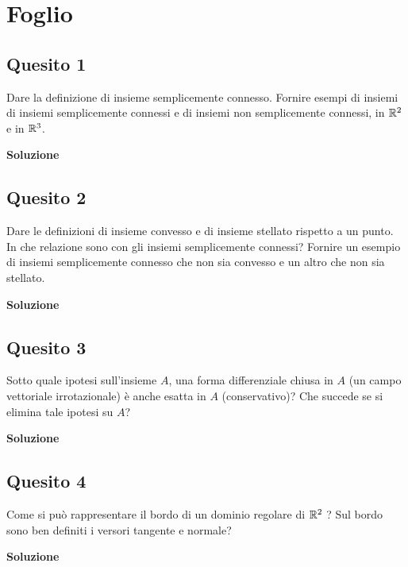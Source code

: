 \chapter{Foglio \ \thechapter}


\section*{Quesito 1}
Dare la definizione di insieme semplicemente connesso. Fornire esempi di
insiemi di insiemi semplicemente connessi e di insiemi non semplicemente connessi, in $\mathbb{R}^2$ e in $\mathbb{R}^3$.

\medskip
\begin{large}
\textbf{Soluzione}
\end{large}


\section*{Quesito 2}
Dare le definizioni di insieme convesso e di insieme stellato rispetto a un
punto. In che relazione sono con gli insiemi semplicemente connessi? Fornire un esempio
di insiemi semplicemente connesso che non sia convesso e un altro che non sia stellato.

\medskip
\begin{large}
\textbf{Soluzione}
\end{large}


\section*{Quesito 3}
Sotto quale ipotesi sull’insieme $A$, una forma differenziale chiusa in $A$ (un
campo vettoriale irrotazionale) è anche esatta in $A$ (conservativo)? Che succede se si
elimina tale ipotesi su $A$?

\medskip
\begin{large}
\textbf{Soluzione}
\end{large}


\section*{Quesito 4}
Come si può rappresentare il bordo di un dominio regolare di $\mathbb{R}^2$ ? Sul bordo
sono ben definiti i versori tangente e normale?

\medskip
\begin{large}
\textbf{Soluzione}
\end{large}


